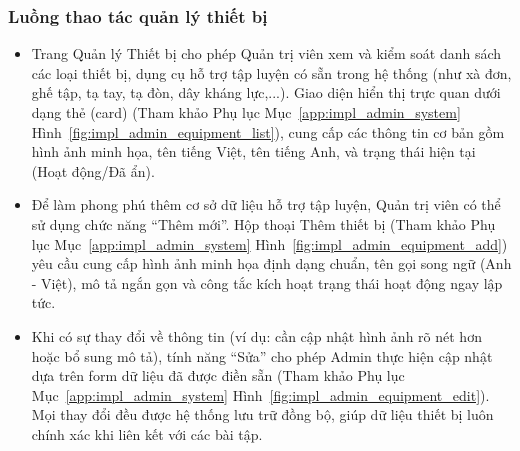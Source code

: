 \subsubsection{Luồng thao tác quản lý thiết bị}
\begin{itemize}
    \item Trang Quản lý Thiết bị cho phép Quản trị viên xem và kiểm soát danh sách các loại thiết bị, dụng cụ hỗ trợ tập luyện có sẵn trong hệ thống (như xà đơn, ghế tập, tạ tay, tạ đòn, dây kháng lực,...). Giao diện hiển thị trực quan dưới dạng thẻ (card) (Tham khảo Phụ lục Mục~\ref{app:impl_admin_system} Hình~\ref{fig:impl_admin_equipment_list}), cung cấp các thông tin cơ bản gồm hình ảnh minh họa, tên tiếng Việt, tên tiếng Anh, và trạng thái hiện tại (Hoạt động/Đã ẩn).


    \item Để làm phong phú thêm cơ sở dữ liệu hỗ trợ tập luyện, Quản trị viên có thể sử dụng chức năng ``Thêm mới''. Hộp thoại Thêm thiết bị (Tham khảo Phụ lục Mục~\ref{app:impl_admin_system} Hình~\ref{fig:impl_admin_equipment_add}) yêu cầu cung cấp hình ảnh minh họa định dạng chuẩn, tên gọi song ngữ (Anh - Việt), mô tả ngắn gọn và công tắc kích hoạt trạng thái hoạt động ngay lập tức.


    \item Khi có sự thay đổi về thông tin (ví dụ: cần cập nhật hình ảnh rõ nét hơn hoặc bổ sung mô tả), tính năng ``Sửa'' cho phép Admin thực hiện cập nhật dựa trên form dữ liệu đã được điền sẵn (Tham khảo Phụ lục Mục~\ref{app:impl_admin_system} Hình~\ref{fig:impl_admin_equipment_edit}). Mọi thay đổi đều được hệ thống lưu trữ đồng bộ, giúp dữ liệu thiết bị luôn chính xác khi liên kết với các bài tập.

\end{itemize}

